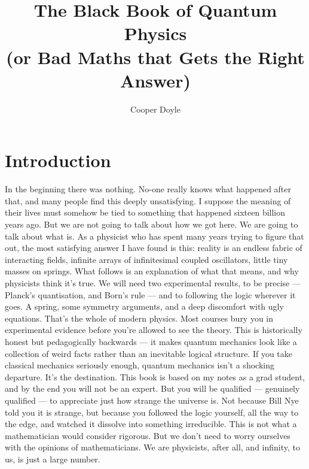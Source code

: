 \documentclass[krantz1,ChapterTOCs]{krantz}
\begin{document}
\frontmatter

\title{The Black Book of Quantum Physics\\
{\large(or Bad Maths that Gets the Right Answer)}
}
\author{Cooper Doyle}

\maketitle

%
\setcounter{page}{2} %
\tableofcontents
%
%
%
%

\mainmatter

\part{Introduction}

In the beginning there was nothing. No-one really knows what happened after that, and many people find this deeply unsatisfying. I suppose the meaning of their lives must somehow be tied to something that happened sixteen billion years ago. But we are not going to talk about how we got here. We are going to talk about what is.
As a physicist who has spent many years trying to figure that out, the most satisfying answer I have found is this: reality is an endless fabric of interacting fields, infinite arrays of infinitesimal coupled oscillators, little tiny masses on springs. What follows is an explanation of what that means, and why physicists think it's true.
We will need two experimental results, to be precise — Planck's quantisation, and Born's rule — and to following the logic wherever it goes. A spring, some symmetry arguments, and a deep discomfort with ugly equations. That's the whole of modern physics.
Most courses bury you in experimental evidence before you're allowed to see the theory. This is historically honest but pedagogically backwards — it makes quantum mechanics look like a collection of weird facts rather than an inevitable logical structure. If you take classical mechanics seriously enough, quantum mechanics isn't a shocking departure. It's the destination.
This book is based on my notes as a grad student, and by the end you will not be an expert. But you will be qualified — genuinely qualified — to appreciate just how strange the universe is. Not because Bill Nye told you it is strange, but because you followed the logic yourself, all the way to the edge, and watched it dissolve into something irreducible.
This is not what a mathematician would consider rigorous. But we don't need to worry ourselves with the opinions of mathematicians. We are physicists, after all, and infinity, to us, is just a large number.
\end{document}
